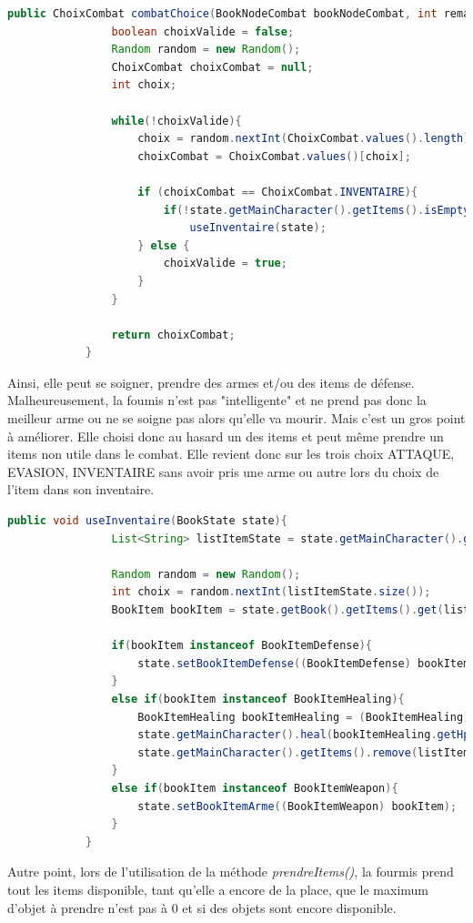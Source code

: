 		\begin{lstlisting}[gobble=12, language=java, caption=combatChoice() de Fourmis]
			public ChoixCombat combatChoice(BookNodeCombat bookNodeCombat, int remainingRoundBeforeEvasion, BookState state) {
				boolean choixValide = false;
				Random random = new Random();
				ChoixCombat choixCombat = null;
				int choix;

				while(!choixValide){
					choix = random.nextInt(ChoixCombat.values().length);
					choixCombat = ChoixCombat.values()[choix];

					if (choixCombat == ChoixCombat.INVENTAIRE){
						if(!state.getMainCharacter().getItems().isEmpty())
							useInventaire(state);
					} else {
						choixValide = true;
					}
				}

				return choixCombat;
			}
		\end{lstlisting}

		 Ainsi, elle peut se soigner, prendre des armes et/ou des items de défense. Malheureusement, la foumis n'est pas "intelligente" et ne prend pas donc la meilleur arme ou ne se soigne pas alors qu'elle va mourir. Mais c'est un gros point à améliorer. Elle choisi donc au hasard un des items et peut même prendre un items non utile dans le combat. Elle revient donc sur les trois choix ATTAQUE, EVASION, INVENTAIRE sans avoir pris une arme ou autre lors du choix de l'item dans son inventaire.

		\begin{lstlisting}[gobble=12, language=java, caption=useInventaire() de Fourmis]
			public void useInventaire(BookState state){
				List<String> listItemState = state.getMainCharacter().getItems();

				Random random = new Random();
				int choix = random.nextInt(listItemState.size());
				BookItem bookItem = state.getBook().getItems().get(listItemState.get(choix));

				if(bookItem instanceof BookItemDefense){
					state.setBookItemDefense((BookItemDefense) bookItem);
				}
				else if(bookItem instanceof BookItemHealing){
					BookItemHealing bookItemHealing = (BookItemHealing) bookItem;
					state.getMainCharacter().heal(bookItemHealing.getHp());
					state.getMainCharacter().getItems().remove(listItemState.get(choix));
				}
				else if(bookItem instanceof BookItemWeapon){
					state.setBookItemArme((BookItemWeapon) bookItem);
				}
			}
		\end{lstlisting}

		Autre point, lors de l'utilisation de la méthode \textit{prendreItems()}, la fourmis prend tout les items disponible, tant qu'elle a encore de la place, que le maximum d'objet à prendre n'est pas à 0 et si des objets sont encore disponible.

